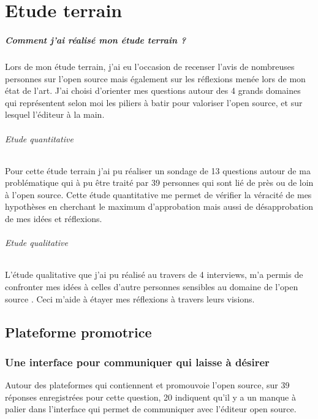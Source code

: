 \chapter{Etude terrain} %

	\paragraph{Comment j'ai réalisé mon étude terrain ? \\}

		Lors de mon étude terrain, j'ai eu l'occasion de recenser l'avis de nombreuses personnes sur l'open source mais également sur les réflexions menée lors de mon état de l'art.
		J'ai choisi d'orienter mes questions autour des 4 grands domaines qui représentent selon moi les piliers à batir pour valoriser l'open source, et sur lesquel l'éditeur à la main.

		\subparagraph{Etude quantitative \\}

		Pour cette étude terrain j'ai pu réaliser un sondage de 13 questions autour de ma problématique qui à pu être traité par 39 personnes qui sont lié de près ou de loin à l'open source. Cette étude quantitative me permet de vérifier la véracité de mes hypothèses en cherchant le maximum d'approbation mais aussi de désapprobation de mes idées et réflexions.

		\subparagraph{Etude qualitative \\}

		L'étude qualitative que j'ai pu réalisé au travers de 4 interviews, m'a permis de confronter mes idées à celles d'autre personnes sensibles au domaine de l'open source . Ceci m'aide à étayer mes réflexions à travers leurs visions.

	\section{Plateforme promotrice}

		\subsection{Une interface pour communiquer qui laisse à désirer}

			Autour des plateformes qui contiennent et promouvoie l'open source, sur 39 réponses enregistrées pour cette question, 20 indiquent qu'il y a un manque à palier dans l'interface qui permet de communiquer avec l'éditeur open source. 

